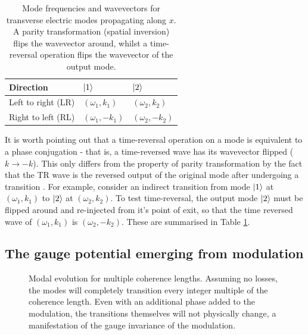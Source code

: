 \begin{table}[b]
	\centering
	\begin{tabular}{|l|l|l|}
		\hline
		Direction & $\ket{1}$         & $\ket{2}$         \\
		\hline
		Left to right (LR) & $(\omega_1,k_1)$  & $(\omega_2,k_2)$  \\
		Right to left (RL) & $(\omega_1,-k_1)$ & $(\omega_2,-k_2)$ \\
		\hline
	\end{tabular}
	\caption[Summary of mode directions and types.]{Mode frequencies and wavevectors for transverse electric modes propagating along $x$. A parity transformation (spatial inversion) flips the wavevector around, whilst a time-reversal operation flips the wavevector of the output mode.}
	\label{tab:modes}
\end{table}

It is worth pointing out that a time-reversal operation on a mode is equivalent to a phase conjugation - that is, a time-reversed wave has its wavevector flipped ($k \rightarrow -k$). This only differs from the property of parity transformation by the fact that the TR wave is the reversed output of the original mode after undergoing a transition \cite{Halzen1985}. For example, consider an indirect transition from mode $\ket{1}$ at $ (\omega_1,k_1)$ to $\ket{2}$ at  $(\omega_2,k_2)$. To test time-reversal, the output mode $\ket{2}$ must be flipped around and re-injected from it's point of exit, so that the time reversed wave of $(\omega_1,k_1)$ is $(\omega_2,-k_2)$. These are summarised in Table \ref{tab:modes}.

\subsection{The gauge potential emerging from modulation} 

\begin{figure}[t]
	\centering
	\setlength{\figH}{\textwidth}
	\setlength{\figW}{\textwidth}
	
	\caption[Modal evolution for multiple coherence lengths]{Modal evolution for multiple coherence lengths. Assuming no losses, the modes will completely transition every integer multiple of the coherence length. Even with an additional phase added to the modulation, the transitions themselves will not physically change, a manifestation of the gauge invariance of the modulation.}
	\label{fig:transition}
\end{figure}


